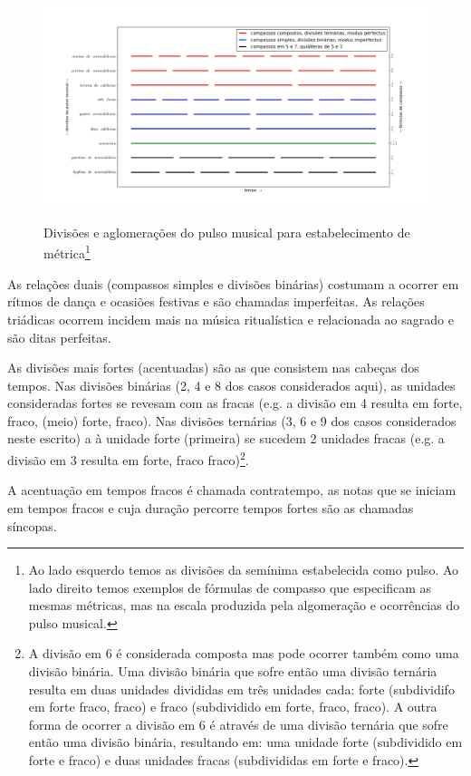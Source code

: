 \begin{figure}[h!]
    \centering
    \caption{Divisões e aglomerações do pulso musical para estabelecimento de métrica\footnote{Ao lado esquerdo temos as divisões da semínima estabelecida como pulso. Ao lado direito temos exemplos de fórmulas de compasso que especificam as mesmas métricas, mas na escala produzida pela algomeração e ocorrências do pulso musical.}}
        \includegraphics[width=\textwidth]{figuras/metricaMusical}
        \label{fig:pulsoSubAgl}
\end{figure}

As relações duais (compassos simples e divisões binárias) costumam a ocorrer em rítmos de dança
e ocasiões festivas e são chamadas imperfeitas. As relações triádicas ocorrem
incidem mais na música ritualística e relacionada ao sagrado
e são ditas perfeitas.

As divisões mais fortes (acentuadas) são as que consistem nas cabeças dos tempos. Nas divisões binárias (2, 4 e 8 dos casos considerados aqui),
as unidades consideradas fortes se revesam com as fracas
(e.g. a divisão em 4 resulta em forte, fraco, (meio) forte, fraco).
Nas divisões ternárias (3, 6 e 9 dos casos considerados neste escrito) a
à unidade forte (primeira) se sucedem 2 unidades fracas (e.g. a divisão em 3 resulta em forte, fraco fraco)\footnote{A divisão em 6 é considerada composta
 mas pode ocorrer também como uma divisão binária.
 Uma divisão binária que sofre então uma divisão ternária
 resulta em duas unidades divididas em três unidades cada: forte (subdividifo em forte fraco, fraco) e fraco (subdividido em forte, fraco, fraco).
A outra forma de ocorrer a divisão em 6 é através de 
uma divisão ternária que sofre então uma divisão binária, resultando em:
uma unidade forte (subdividido em forte e fraco) e duas unidades fracas (subdivididas em forte e fraco).}.

A acentuação em tempos fracos é chamada contratempo, as notas que se iniciam em tempos fracos e cuja duração percorre tempos fortes são as chamadas síncopas.


